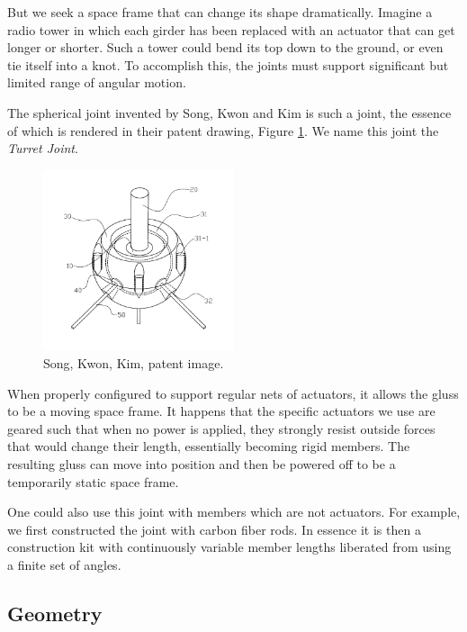\documentclass[11pt]{article}
\begin{document}
But we seek a space frame that can change its shape dramatically. Imagine a radio tower in which
each girder has been replaced with an actuator that can get longer or shorter. Such a tower could
bend its top down to the ground, or even
tie itself into a knot. To accomplish this, the joints must support significant 
but limited range of angular motion. 

The spherical joint invented by Song, Kwon and Kim \cite{song2003spherical} is such a joint,
the essence of which is rendered in their patent drawing, Figure \ref{SongKwonKimImage}.
We name this joint the \emph{Turret Joint}.

\begin{figure}[!ht]
  \centering
    \includegraphics[width=0.5\textwidth]{figureslowres/SongKwonKimImage.png}
    \caption[Song, Kwon, Kim, patent image.]{Song, Kwon, Kim, patent image.}
      \label{SongKwonKimImage}
\end{figure}

When properly configured to support regular nets of actuators,
it allows the gluss to be a moving space frame. It happens that the specific actuators we use
are geared such that when no power is applied, they strongly resist outside forces that would change their length,
essentially becoming rigid members.
The resulting gluss
can move into position and then be powered off to be a temporarily static space frame.

One could also use this joint with members which are not actuators. For example, we first
constructed the joint with carbon fiber rods. In essence it is then a construction kit with continuously
variable member lengths liberated from using a finite set of angles.

\subsection{Geometry}
\end{document}
